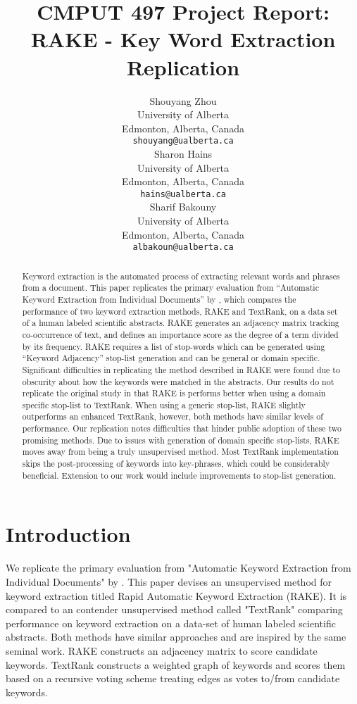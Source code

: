 \documentclass[11pt,a4paper]{article}
\title{CMPUT 497 Project Report: \\ RAKE - Key Word Extraction Replication}
\author{Shouyang Zhou \\
  University of Alberta \\
  Edmonton, Alberta, Canada \\
  {\tt shouyang@ualberta.ca} \\\And
  Sharon Hains \\
  University of Alberta \\
  Edmonton, Alberta, Canada \\
  {\tt hains@ualberta.ca} \\\And
  Sharif Bakouny\\
  University of Alberta \\
  Edmonton, Alberta, Canada \\
  {\tt albakoun@ualberta.ca} \\}
\date{}
\begin{document}
\maketitle

\begin{abstract}
Keyword extraction is the automated process of extracting relevant words and phrases from a document. This paper replicates the primary evaluation from “Automatic Keyword Extraction from Individual Documents” by \citet{1}, which compares the performance of two keyword extraction methods, RAKE and TextRank, on a data set of a human labeled scientific abstracts.
RAKE generates an adjacency matrix tracking co-occurrence of text, and deﬁnes an importance score as the degree of a term divided by its frequency. RAKE requires a list of stop-words which can be generated using “Keyword Adjacency” stop-list generation and can be general or domain specific. 
Significant difficulties in replicating the method described in RAKE were found due to obscurity about how the keywords were matched in the abstracts. 
Our results do not replicate the original study in that RAKE is performs better when using a domain specific stop-list to TextRank. When using a generic stop-list, RAKE slightly outperforms an enhanced TextRank, however, both methods have similar levels of performance. Our replication notes difficulties that hinder public adoption of these two promising methods. Due to issues with generation of domain specific stop-lists, RAKE moves away from being a truly unsupervised method. Most TextRank implementation skips the post-processing of keywords into key-phrases, which could be considerably beneficial. Extension to our work would include improvements to stop-list generation.
	
\end{abstract}

\section{Introduction}

We replicate the primary evaluation from "Automatic Keyword Extraction from Individual Documents" by \citet{1}. This paper devises an unsupervised method for keyword extraction titled Rapid Automatic Keyword Extraction (RAKE). It is compared to an contender unsupervised method called "TextRank" comparing performance on keyword extraction on a data-set of human labeled scientific abstracts. Both methods have similar approaches and are inspired by the same seminal work. RAKE constructs an adjacency matrix to score candidate keywords. TextRank constructs a weighted graph of keywords and scores them based on a recursive voting scheme treating edges as votes to/from candidate keywords.
\end{document}
